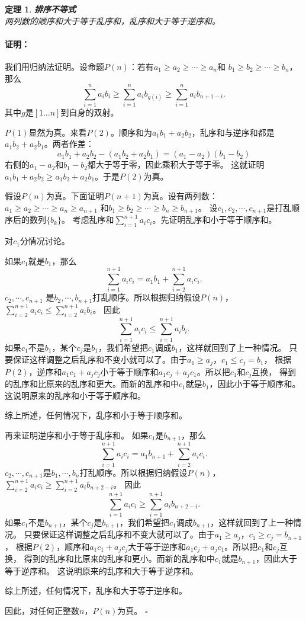 \documentclass[12pt,UTF8]{ctexbook}
\newtheorem{tm}{定理}[section]
\renewenvironment{proof}{\paragraph{\textbf{证明：}}}{\hfill$\square$}
\begin{document}
\begin{tm}\textbf{排序不等式}\\
    两列数的顺序和大于等于乱序和，乱序和大于等于逆序和。
\end{tm}
\begin{proof}
    我们用归纳法证明。设命题$P(n)$：若有$a_1 \geqslant a_2 \geqslant \cdots \geqslant a_n$和
    $b_1 \geqslant b_2 \geqslant \cdots \geqslant b_n$，那么
    $$ \sum_{i=1}^n a_ib_i \geqslant \sum_{i=1}^n a_ib_{g(i)} \geqslant \sum_{i=1}^n a_ib_{n+1-i} . $$
    其中$g$是$[1\dots n]$到自身的双射。

    $P(1)$显然为真。来看$P(2)$。顺序和为$a_1b_1 + a_2b_2$，乱序和与逆序和都是$a_1b_2 + a_2b_1$。两者作差：
    $$ a_1b_1 + a_2b_2 - (a_1b_2 + a_2b_1) = (a_1 - a_2)(b_1 - b_2) $$
    右侧的$a_1-a_2$和$b_1-b_2$都大于等于零，因此乘积大于等于零。
    这就证明$a_1b_1 + a_2b_2 \geqslant a_1b_2 + a_2b_1$。于是$P(2)$为真。

    假设$P(n)$为真。下面证明$P(n+1)$为真。设有两列数：
    $a_1 \geqslant a_2 \geqslant \cdots \geqslant a_n\geqslant a_{n+1}$
    和$b_1 \geqslant b_2 \geqslant \cdots \geqslant b_n \geqslant b_{n+1}$。
    设$c_1, c_2, \cdots , c_{n+1}$是打乱顺序后的数列$\{b_k\}$。
    考虑乱序和$\sum_{i=1}^{n+1} a_i c_i$。先证明乱序和小于等于顺序和。

    对$c_{1}$分情况讨论。

    如果$c_1$就是$b_1$，那么
    $$\sum_{i=1}^{n+1} a_i c_i = a_1b_1 + \sum_{i=2}^{n+1} a_i c_i.$$
    $c_2, \cdots, c_{n+1}$
    是$b_2, \cdots, b_{n+1}$打乱顺序。所以根据归纳假设$P(n)$，
    $\sum_{i=2}^{n+1} a_i c_i \leqslant \sum_{i=2}^{n+1} a_i b_i$。
    因此
    $$\sum_{i=1}^{n+1} a_i c_i \leqslant \sum_{i=1}^{n+1} a_i b_i.$$
    如果$c_1$不是$b_1$，某个$c_j$是$b_1$，我们希望把$c_1$调成$b_1$，这样就回到了上一种情况。
    只要保证这样调整之后乱序和不变小就可以了。由于$a_1 \geqslant a_j$，$c_1 \leqslant c_j = b_1$，
    根据$P(2)$，逆序和$a_1c_1 + a_jc_j$小于等于顺序和$a_1c_j + a_jc_1$。所以把$c_1$和$c_j$互换，
    得到的乱序和比原来的乱序和更大。而新的乱序和中$c_1$就是$b_1$，因此小于等于顺序和。
    这说明原来的乱序和小于等于顺序和。

    综上所述，任何情况下，乱序和小于等于顺序和。

    再来证明逆序和小于等于乱序和。
    如果$c_1$是$b_{n+1}$，那么
    $$\sum_{i=1}^{n+1} a_i c_i = a_1b_{n+1} + \sum_{i=2}^{n+1} a_i c_i.$$
    $c_2, \cdots, c_{n+1}$是$b_1, \cdots, b_{n}$打乱顺序。所以根据归纳假设$P(n)$，
    $\sum_{i=2}^{n+1} a_i c_i \geqslant \sum_{i=2}^{n+1} a_i b_{n+2-i}$。
    因此
    $$\sum_{i=1}^{n+1} a_i c_i \geqslant \sum_{i=1}^{n+1} a_i b_{n+2-i}.$$
    如果$c_1$不是$b_{n+1}$，某个$c_j$是$b_{n+1}$，我们希望把$c_1$调成$b_{n+1}$，这样就回到了上一种情况。
    只要保证这样调整之后乱序和不变大就可以了。由于$a_1 \geqslant a_j$，$c_1 \geqslant c_j = b_{n+1}$，
    根据$P(2)$，顺序和$a_1c_1 + a_jc_j$大于等于逆序和$a_1c_j + a_jc_1$。所以把$c_1$和$c_j$互换，
    得到的乱序和比原来的乱序和更小。而新的乱序和中$c_1$就是$b_{n+1}$，因此大于等于逆序和。
    这说明原来的乱序和大于等于逆序和。

    综上所述，任何情况下，乱序和大于等于逆序和。
    
    因此，对任何正整数$n$，$P(n)$为真。
\end{proof}
\end{document}
